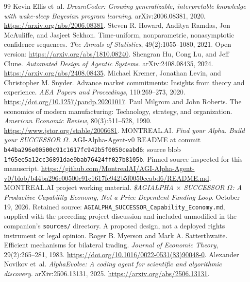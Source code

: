 \documentclass[11pt,letterpaper]{article}
\theoremstyle{remark}\newtheorem{remark}{Remark}[section]
\begin{document}
\begin{thebibliography}{99}
Kevin Ellis et~al. \emph{DreamCoder: Growing generalizable, interpretable knowledge with wake-sleep Bayesian program learning}. arXiv:2006.08381, 2020. \url{https://arxiv.org/abs/2006.08381}.
Steven R. Howard, Aaditya Ramdas, Jon McAuliffe, and Jasjeet Sekhon. Time-uniform, nonparametric, nonasymptotic confidence sequences. \emph{The Annals of Statistics}, 49(2):1055--1080, 2021. Open version: \url{https://arxiv.org/abs/1810.08240}.
Shengran Hu, Cong Lu, and Jeff Clune. \emph{Automated Design of Agentic Systems}. arXiv:2408.08435, 2024. \url{https://arxiv.org/abs/2408.08435}.
Michael Kremer, Jonathan Levin, and Christopher M. Snyder. Advance market commitments: Insights from theory and experience. \emph{AEA Papers and Proceedings}, 110:269--273, 2020. \url{https://doi.org/10.1257/pandp.20201017}.
Paul Milgrom and John Roberts. The economics of modern manufacturing: Technology, strategy, and organization. \emph{American Economic Review}, 80(3):511--528, 1990. \url{https://www.jstor.org/stable/2006681}.
MONTREAL.AI. \emph{Find your Alpha. Build your SUCCESSOR $\Omega$.} AGI-Alpha-Agent-v0 README at commit \texttt{b44ba296e00500c91c1617fc942b5f0050ceabd6}; source blob \texttt{1f65ee5a12cc36891dae9bab76424ff027b8105b}. Pinned source inspected for this manuscript. \url{https://github.com/MontrealAI/AGI-Alpha-Agent-v0/blob/b44ba296e00500c91c1617fc942b5f0050ceabd6/README.md}.
MONTREAL.AI project working material. \emph{\$AGIALPHA $\times$ SUCCESSOR $\Omega$: A Productive-Capability Economy, Not a Price-Dependent Funding Loop}. October 19, 2026. Retained source: \texttt{AGIALPHA\_SUCCESSOR\_Capability\_Economy.md}, supplied with the preceding project discussion and included unmodified in the companion's \texttt{sources/} directory. A proposed design, not a deployed rights instrument or legal opinion.
Roger B. Myerson and Mark A. Satterthwaite. Efficient mechanisms for bilateral trading. \emph{Journal of Economic Theory}, 29(2):265--281, 1983. \url{https://doi.org/10.1016/0022-0531(83)90048-0}.
Alexander Novikov et~al. \emph{AlphaEvolve: A coding agent for scientific and algorithmic discovery}. arXiv:2506.13131, 2025. \url{https://arxiv.org/abs/2506.13131}.

\end{thebibliography}
\end{document}
